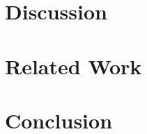 \documentclass[thesis]{plai}
\begin{document}
\chapter{Discussion}
\label{chapter:discussion}

\chapter{Related Work}
\label{chapter:related-work}


\chapter{Conclusion}
\label{chapter:conclusion}








%

\end{document}
